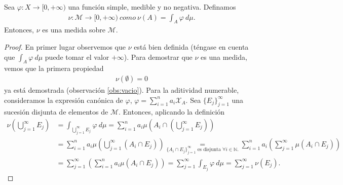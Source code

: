 \begin{prop}
    Sea $\varphi: X \longrightarrow [0, +\infty)$ una función simple, medible y no negativa. Definamos
    \begin{align*}
        \nu: \mathcal{M} \longrightarrow [0,+\infty) \ como \ \nu(A) = \int_{A}{\varphi \ d\mu}.
    \end{align*}
    Entonces, $\nu$ es una medida sobre $\mathcal{M}$.
\end{prop}

\begin{proof}
    En primer lugar observemos que $\nu$ está bien definida (téngase en cuenta que $\int_{A}{\varphi \ d\mu}$ puede tomar el valor $+\infty$). Para demostrar que $\nu$ es una medida, vemos que la primera propiedad
    \begin{align*}
        \nu(\emptyset) = 0
    \end{align*}
    ya está demostrada (observación \ref{obs:vacio}). Para la aditividad numerable, consideramos la expresión canónica de $\varphi$, $\varphi = \sum_{i=1}^{n}{a_i \mathcal{X}_A}$. Sea $\{ E_j \}_{j=1}^{\infty}$ una sucesión disjunta de elementos de $\mathcal{M}$. Entonces, aplicando la definición
    \begin{align*}
        \nu\left( \bigcup_{j=1}^{\infty}{E_j}\right) & = \int_{\bigcup_{j=1}^{\infty}{E_j}}{\varphi \ d\mu} = \sum_{i=1}^{n}{a_i\mu\left( A_i \cap \left( \bigcup_{j=1}^{\infty}{E_j} \right) \right)}                                                                                                    \\
                                                     & = \sum_{i=1}^{n}{a_i\mu\left( \bigcup_{j=1}^{\infty}{(A_i \cap E_j)}\right)} \underset{\{ A_i \cap E_j\}_{j=1}^{\infty} \text{ es disjunta } \forall i \in \mathbb{N}.}{=} \sum_{i=1}^{n}{a_i\left( \sum_{j=1}^{\infty}{\mu(A_i \cap E_j)}\right)} \\
                                                     & = \sum_{j=1}^{\infty}{\left( \sum_{i=1}^{n}{a_i\mu(A_i \cap E_j)} \right)} = \sum_{j=1}^{\infty}{\int_{E_j}{\varphi \ d\mu}} = \sum_{j=1}^{\infty}{\nu(E_j)}.
    \end{align*}
\end{proof}

